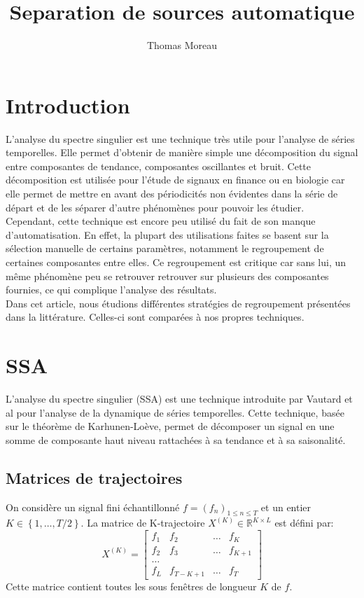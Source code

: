 \documentclass{gretsi}
\title{Separation de sources automatique}
\author{Thomas Moreau}
\date{}
\begin{document}
\maketitle


\section{Introduction}

L'analyse du spectre singulier est une technique très utile pour l'analyse de séries temporelles. Elle permet d'obtenir de manière simple une décomposition du signal entre composantes de tendance, composantes oscillantes et bruit. Cette décomposition est utilisée pour l'étude de signaux en finance ou en biologie car elle permet de mettre en avant des périodicités non évidentes dans la série de départ et de les séparer d'autre phénomènes pour pouvoir les étudier.\\


Cependant, cette technique est encore peu utilisé du fait de son manque d'automatisation. En effet, la plupart des utilisations faites se basent sur la sélection manuelle de certains paramètres, notamment le regroupement de certaines composantes entre elles. Ce regroupement est critique car sans lui, un même phénomène peu se retrouver retrouver sur plusieurs des composantes fournies, ce qui complique l'analyse des résultats.\\


Dans cet article, nous étudions différentes stratégies de regroupement présentées dans la littérature. Celles-ci sont comparées à nos propres techniques.

\section{SSA}

L'analyse du spectre singulier (SSA) est une technique introduite par Vautard et al \cite{vautard_ghil_89_SSA} pour l'analyse de la dynamique de séries temporelles. Cette technique, basée sur le théorème de Karhunen-Loève, permet de décomposer un signal en une somme de composante haut niveau rattachées à sa tendance et à sa saisonalité.

\subsection{Matrices de trajectoires}

On considère un signal fini échantillonné $f = (f_n)_{1 \le n\le T}$ et un entier $K \in \left \{ 1, \dots, T/2 \right \}$. La matrice de K-trajectoire $X^{(K)} \in \mathbb{R}^{K\times L}$ est défini par:
$$ X^{(K)} = \begin{bmatrix}
	f_1 & f_2 &\dots & f_K\\
	f_2 & f_3 &\dots & f_{K+1}\\
	\dots\\
	f_{L} & f_{T-K+1} &\dots & f_T
\end{bmatrix}$$
Cette matrice contient toutes les sous fenêtres de longueur $K$ de $f$.\\
\end{document}
